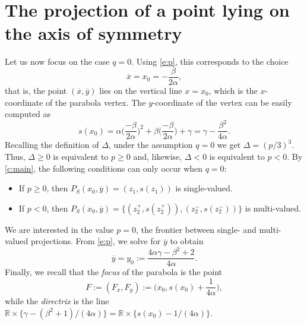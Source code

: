 \documentclass[11pt]{article}
\newcommand{\RR}{\ensuremath{\mathbb R}}
\providecommand{\RR}{\mathbb{R}}
\providecommand{\RR}{\mathbb{R}}
\newcommand{\px}{\overline{x}}
\newcommand{\py}{\overline{y}}
\begin{document}
\section{The projection of a point lying on the axis of symmetry}

Let us now focus on the case $q=0$. Using \cref{e:p}, this corresponds to the choice
\begin{equation}\label{e:xbar}
    \px=x_0=-\frac{\beta}{2\alpha},
\end{equation}
that is, the point $(\px,\py)$ lies on the vertical line $x=x_0$, which is the $x$-coordinate of the parabola vertex. The $y$-coordinate of the vertex can be easily computed as
\begin{equation}\label{e:s(xbar)}
    s(x_0)=\alpha\Big(\frac{-\beta}{2\alpha}\Big)^2+\beta\Big(\frac{-\beta}{2\alpha}\Big)+\gamma=\gamma-\frac{\beta^2}{4\alpha}.
\end{equation}
Recalling the definition of $\Delta$, under the assumption $q=0$ we get $\Delta=(p/3)^3$. Thus, $\Delta\geq0$ is equivalent to $p\geq0$ and, likewise, $\Delta<0$ is equivalent to $p<0$. By \cref{c:main}, the following conditions can only occur when $q=0$:
\begin{itemize}%
    \item If $p\geq0$, then $P_S(x_0,\py)=(z_1,s(z_1))$ is single-valued.
    \item If $p<0$, then $P_S(x_0,\py)=\{(z^+_2,s(z^+_2)),(z^-_2,s(z^-_2))\}$ is multi-valued.
\end{itemize}
We are interested in the value $p=0$, the frontier between single- and multi-valued projections. From \cref{e:p}, we solve for $\py$ to obtain
\begin{equation}\label{e:ybar}
\py=y_0:=\frac{4\alpha\gamma-\beta^2+2}{4\alpha}.
\end{equation}
Finally, we recall that the \emph{focus} of the parabola is the point
\begin{equation}\label{e:focus}
    F:= (F_x,F_y) := \Big(x_0,s(x_0)+\frac1{4\alpha}\Big),
\end{equation}
while the \emph{directrix} is the line $\RR\times\{\gamma -(\beta^2+1)/(4\alpha)\} 
= \RR\times \{s(x_0) - 1/(4\alpha)\}$. 
\end{document}
